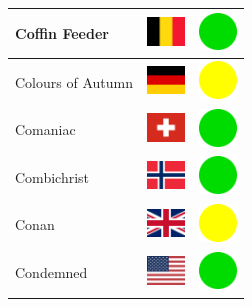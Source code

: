 \documentclass[12pt, a4paper, twoside]{report}
\begin{document}
\begin{center}
\begin{longtable}{|p{5cm}|p{2cm}|p{2cm}|}
Coffin Feeder & \includegraphics[width=1cm]{4x3/be} & \includegraphics[width=1cm]{likes/y} \\ \hline
Colours of Autumn & \includegraphics[width=1cm]{4x3/de} & \includegraphics[width=1cm]{likes/m} \\ \hline
Comaniac & \includegraphics[width=1cm]{4x3/ch} & \includegraphics[width=1cm]{likes/y} \\ \hline
Combichrist & \includegraphics[width=1cm]{4x3/no} & \includegraphics[width=1cm]{likes/y} \\ \hline
Conan & \includegraphics[width=1cm]{4x3/gb} & \includegraphics[width=1cm]{likes/m} \\ \hline
Condemned & \includegraphics[width=1cm]{4x3/us} & \includegraphics[width=1cm]{likes/y} \\ \hline

\end{longtable}
\end{center}
\end{document}
